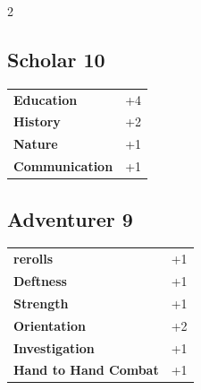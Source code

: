 \begin{multicols}{2}
\begin{tcolorbox}
\end{tcolorbox}

\begin{tcolorbox}
    \subsection*{Scholar \hfill \small{10 }}
    \tcblower




\begin{tabular}{@{}ll@{}}
    \textbf{Education} & +4\\
    \textbf{History} & +2\\
    \textbf{Nature} & +1\\
    \textbf{Communication} & +1\\
\end{tabular}


\end{tcolorbox}

\begin{tcolorbox}
    \subsection*{Adventurer \hfill \small{9 }}
    \tcblower




\begin{tabular}{@{}ll@{}}
    \textbf{rerolls} & +1\\
    \textbf{Deftness} & +1\\
    \textbf{Strength} & +1\\
    \textbf{Orientation} & +2\\
    \textbf{Investigation} & +1\\
    \textbf{Hand to Hand Combat} & +1\\
\end{tabular}


\end{tcolorbox}

\begin{tcolorbox}

\end{tcolorbox}
\end{multicols}
